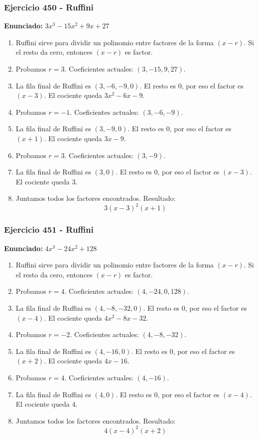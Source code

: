 \documentclass[11pt,a4paper]{article}
\begin{document}
\vspace{0.2cm}
\subsubsection*{Ejercicio 450 - Ruffini}
\textbf{Enunciado:} $ 3 x^{3} - 15 x^{2} + 9 x + 27 $\par
\begin{enumerate}[leftmargin=2em]
\item Ruffini sirve para dividir un polinomio entre factores de la forma \((x-r)\). Si el resto da cero, entonces \((x-r)\) es factor.
\item Probamos \(r=3\). Coeficientes actuales: \((3, -15, 9, 27)\).
\item La fila final de Ruffini es \((3, -6, -9, 0)\). El resto es \(0\), por eso el factor es \((x-3)\). El cociente queda \(3 x^{2} - 6 x - 9\).
\item Probamos \(r=-1\). Coeficientes actuales: \((3, -6, -9)\).
\item La fila final de Ruffini es \((3, -9, 0)\). El resto es \(0\), por eso el factor es \((x+1)\). El cociente queda \(3 x - 9\).
\item Probamos \(r=3\). Coeficientes actuales: \((3, -9)\).
\item La fila final de Ruffini es \((3, 0)\). El resto es \(0\), por eso el factor es \((x-3)\). El cociente queda \(3\).
\item Juntamos todos los factores encontrados. Resultado: \[\boxed{3 \left(x - 3\right)^{2} \left(x + 1\right)}\]
\end{enumerate}

\vspace{0.2cm}
\subsubsection*{Ejercicio 451 - Ruffini}
\textbf{Enunciado:} $ 4 x^{3} - 24 x^{2} + 128 $\par
\begin{enumerate}[leftmargin=2em]
\item Ruffini sirve para dividir un polinomio entre factores de la forma \((x-r)\). Si el resto da cero, entonces \((x-r)\) es factor.
\item Probamos \(r=4\). Coeficientes actuales: \((4, -24, 0, 128)\).
\item La fila final de Ruffini es \((4, -8, -32, 0)\). El resto es \(0\), por eso el factor es \((x-4)\). El cociente queda \(4 x^{2} - 8 x - 32\).
\item Probamos \(r=-2\). Coeficientes actuales: \((4, -8, -32)\).
\item La fila final de Ruffini es \((4, -16, 0)\). El resto es \(0\), por eso el factor es \((x+2)\). El cociente queda \(4 x - 16\).
\item Probamos \(r=4\). Coeficientes actuales: \((4, -16)\).
\item La fila final de Ruffini es \((4, 0)\). El resto es \(0\), por eso el factor es \((x-4)\). El cociente queda \(4\).
\item Juntamos todos los factores encontrados. Resultado: \[\boxed{4 \left(x - 4\right)^{2} \left(x + 2\right)}\]
\end{enumerate}
\end{document}
